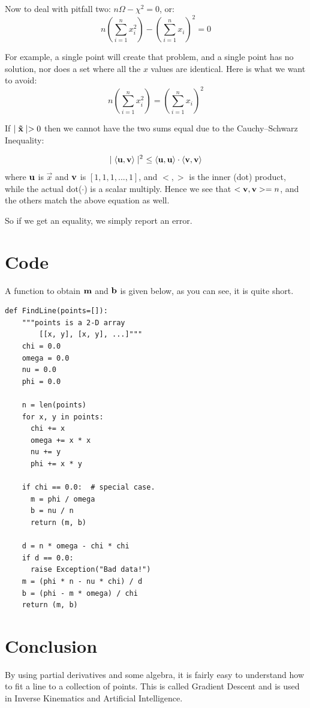 \documentclass{article}
\begin{document}
Now to deal with pitfall two: $n \Omega - \chi^2 = 0$, or:
\begin{equation}
n  \left( \sum_{i=1}^n x_i^2 \right) - \left( \sum_{i=1}^n x_i \right)^2 = 0
\end{equation}

For example, a single point will create that problem, and a single point
has no solution, nor does a set where all the $x$ values are identical. Here is what we want to avoid:
\begin{equation}
n  \left( \sum_{i=1}^n x_i^2 \right) = \left( \sum_{i=1}^n x_i \right)^2
\end{equation}

If $\mid{\bf \vec{x} }\mid > 0$ then we cannot have the two sums equal due to
the  Cauchy–Schwarz Inequality:

\begin{equation}
\mid\left<{\bf u},{\bf v}\right>\mid^2 \
\le \left<{\bf u},{\bf u}\right>\cdot\left<{\bf v},{\bf v}\right>
\end{equation} 
where ${\bf u}$ is $\vec{x}$ and ${\bf v}$ is $[1, 1, 1, ..., 1]$, and
$< , >$ is the inner (dot) product, while the actual dot($\cdot$) is a
scalar multiply.   Hence we see that $<{\bf v}, {\bf v}> = n$, and the others
match the above equation as well.

So if we get an equality, we simply report an error.

\vfill

\section{Code}
A function to obtain ${\bf m}$ and ${\bf b}$ is given below, as you can see,
it is quite short.
\lstset{language=Python}
\begin{lstlisting}[frame=single]
def FindLine(points=[]):
    """points is a 2-D array
        [[x, y], [x, y], ...]"""
    chi = 0.0
    omega = 0.0
    nu = 0.0
    phi = 0.0

    n = len(points)
    for x, y in points:
      chi += x
      omega += x * x
      nu += y
      phi += x * y

    if chi == 0.0:  # special case.
      m = phi / omega
      b = nu / n
      return (m, b)

    d = n * omega - chi * chi
    if d == 0.0:
      raise Exception("Bad data!")
    m = (phi * n - nu * chi) / d
    b = (phi - m * omega) / chi
    return (m, b)
\end{lstlisting}

\section{Conclusion}

By using partial derivatives and some algebra, it is fairly easy to
understand how to fit a line to a collection of points.  This is
called Gradient Descent and is used in Inverse Kinematics and
Artificial Intelligence.
\end{document}
